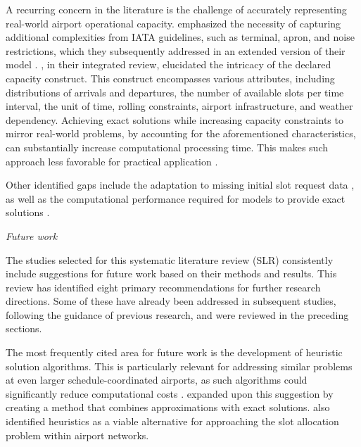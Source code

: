 A recurring concern in the literature is the challenge of accurately representing real-world airport operational capacity.  emphasized the necessity of capturing additional complexities from IATA guidelines, such as terminal, apron, and noise restrictions, which they subsequently addressed in an extended version of their model \cite{ribeiro_large-scale_2019}. , in their integrated review, elucidated the intricacy of the declared capacity construct. This construct encompasses various attributes, including distributions of arrivals and departures, the number of available slots per time interval, the unit of time, rolling constraints, airport infrastructure, and weather dependency. Achieving exact solutions while increasing capacity constraints to mirror real-world problems, by accounting for the aforementioned characteristics, can substantially increase computational processing time. This makes such approach less favorable for practical application \cite{benlic_heuristic_2018, wang_slot_2023}.

Other identified gaps include the adaptation to missing initial slot request data \cite{pellegrini_sosta_2017, keskin_optimal_2023}, as well as the computational performance required for models to provide exact solutions \cite{ribeiro2018optimization}.

\hfill \break
\textit{Future work}
\hfill \break

The studies selected for this systematic literature review (\acrshort{SLR}) consistently include suggestions for future work based on their methods and results. This review has identified eight primary recommendations for further research directions. Some of these have already been addressed in subsequent studies, following the guidance of previous research, and were reviewed in the preceding sections.

The most frequently cited area for future work is the development of heuristic solution algorithms. This is particularly relevant for addressing similar problems at even larger schedule-coordinated airports, as such algorithms could significantly reduce computational costs \cite{ribeiro2018optimization, zografos_bi-objective_2019, liu_research_2022}.  expanded upon this suggestion by creating a method that combines approximations with exact solutions.  also identified heuristics as a viable alternative for approaching the slot allocation problem within airport networks.

